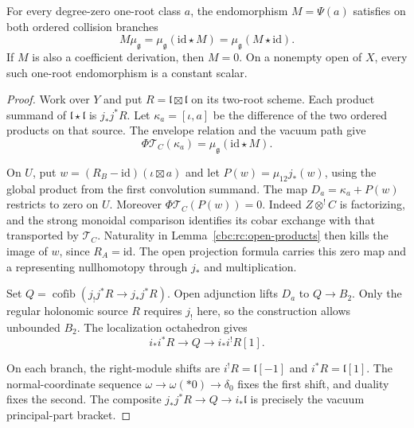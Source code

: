 \begin{lemma}\label{cbc:rc:one-root-module}
For every degree-zero one-root class $a$, the
endomorphism $M=\Psi(a)$ satisfies on both
ordered collision branches
\begin{equation}\label{cbc:rc:module-identity}
 M\mu_{\mathfrak g}
 =\mu_{\mathfrak g}(\mathrm{id}\star M)
 =\mu_{\mathfrak g}(M\star\mathrm{id}).
\end{equation}
If $M$ is also a coefficient derivation, then
$M=0$. On a nonempty open of $X$, every such
one-root endomorphism is a constant scalar.
\end{lemma}
\begin{proof}
Work over $Y$ and put $R=\mathfrak l\boxtimes\mathfrak l$
on its two-root scheme. Each product summand of
$\mathfrak l\star\mathfrak l$ is $j_*j^*R$.
Let $\kappa_a=[\iota,a]$ be the difference of
the two ordered products on that source.
The envelope relation and the vacuum path give
\begin{equation}\label{cbc:rc:commutator-image}
 \Phi\mathcal T_C(\kappa_a)
       =\mu_{\mathfrak g}(\mathrm{id}\star M).
\end{equation}

On $U$, put $w=(R_B-\mathrm{id})(\iota\boxtimes a)$
and let $P(w)=\mu_{12}j_*(w)$, using the global
product from the first convolution summand.
The map $D_a=\kappa_a+P(w)$ restricts to zero on
$U$. Moreover $\Phi\mathcal T_C(P(w))=0$.
Indeed $Z\otimes^!C$ is factorizing, and the
strong monoidal comparison identifies its cobar
exchange with that transported by $\mathcal T_C$.
Naturality in Lemma~\ref{cbc:rc:open-products}
then kills the image of $w$, since $R_A=\mathrm{id}$.
The open projection formula carries this zero
map and a representing nullhomotopy through
$j_*$ and multiplication.

Set $Q=\operatorname{cofib}(j_!j^*R\to j_*j^*R)$.
Open adjunction lifts $D_a$ to $Q\to B_2$.
Only the regular holonomic source $R$ requires
$j_!$ here, so the construction allows unbounded
$B_2$. The localization octahedron gives
\begin{equation}\label{cbc:rc:localization-triangle}
 i_*i^*R\longrightarrow Q\longrightarrow i_*i^!R[1].
\end{equation}

On each branch, the right-module shifts are
$i^!R=\mathfrak l[-1]$ and
$i^*R=\mathfrak l[1]$.
The normal-coordinate sequence
$\omega\to\omega(*0)\to\delta_0$
fixes the first shift, and duality fixes the
second. The composite
$j_*j^*R\to Q\to i_*\mathfrak l$ is precisely
the vacuum principal-part bracket.


\end{proof}
